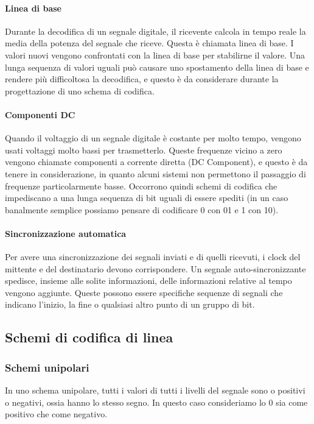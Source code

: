         \paragraph{Linea di base} Durante la decodifica di un segnale digitale, il ricevente calcola in tempo reale la media della potenza del segnale che riceve. Questa è chiamata linea di base. I valori nuovi vengono confrontati con la linea di base per stabilirne il valore. Una lunga sequenza di valori uguali può causare uno spostamento della linea di base e rendere più difficoltosa la decodifica, e questo è da considerare durante la progettazione di uno schema di codifica.
        
        \paragraph{Componenti DC} Quando il voltaggio di un segnale digitale è costante per molto tempo, vengono usati voltaggi molto bassi per trasmetterlo. Queste frequenze vicino a zero vengono chiamate componenti a corrente diretta (DC Component), e questo è da tenere in considerazione, in quanto alcuni sistemi non permettono il passaggio di frequenze particolarmente basse. Occorrono quindi schemi di codifica che impediscano a una lunga sequenza di bit uguali di essere spediti (in un caso banalmente semplice possiamo pensare di codificare 0 con 01 e 1 con 10).
        
        \paragraph{Sincronizzazione automatica} Per avere una sincronizzazione dei segnali inviati e di quelli ricevuti, i clock del mittente e del destinatario devono corrispondere. Un segnale auto-sincronizzante spedisce, insieme alle solite informazioni, delle informazioni relative al tempo vengono aggiunte. Queste possono essere specifiche sequenze di segnali che indicano l'inizio, la fine o qualsiasi altro punto di un gruppo di bit.
        
    \subsection{Schemi di codifica di linea}
        \subsubsection{Schemi unipolari}
            In uno schema unipolare, tutti i valori di tutti i livelli del segnale sono o positivi o negativi, ossia hanno lo stesso segno. In questo caso consideriamo lo 0 sia come positivo che come negativo.
            
